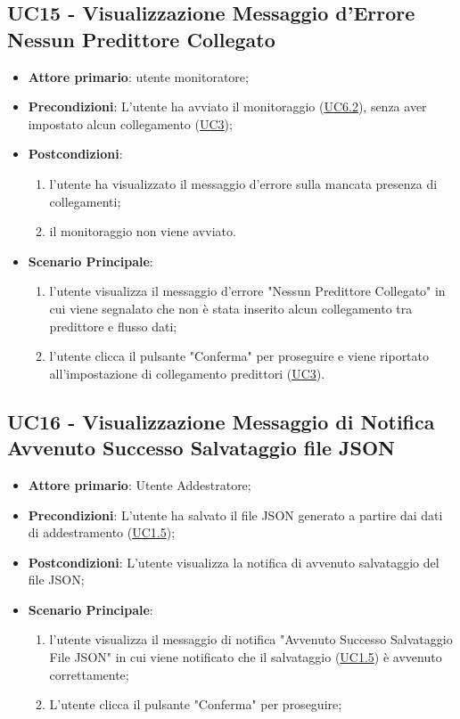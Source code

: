 	\subsection{UC15 - Visualizzazione Messaggio d'Errore Nessun Predittore Collegato}
		\begin{itemize}
			\item\textbf{Attore primario}: utente monitoratore;
			\item\textbf{Precondizioni}: L’utente ha avviato il monitoraggio (\hyperref[par:UC6.2]{UC6.2}), senza aver impostato alcun collegamento (\hyperref[par:UC3]{UC3});
			\item\textbf{Postcondizioni}: 
				\begin{enumerate}
					\item l’utente ha visualizzato il messaggio d'errore sulla mancata presenza di collegamenti;	
					\item	il monitoraggio non viene avviato.
				\end{enumerate}
			\item\textbf{Scenario Principale}: 
				\begin{enumerate} 
					\item l’utente visualizza il messaggio d'errore "Nessun Predittore Collegato" in cui viene segnalato che non è stata inserito alcun collegamento tra predittore e flusso dati; 
					\item l'utente clicca il pulsante "Conferma" per proseguire e viene riportato all'impostazione di collegamento predittori (\hyperref[par:UC3]{UC3}).		
				\end{enumerate}		
		\end{itemize}


	\label{par:UC16}
	\subsection{UC16 - Visualizzazione Messaggio di Notifica Avvenuto Successo Salvataggio file JSON}
		\begin{itemize}
			\item\textbf{Attore primario}: Utente Addestratore;
			\item\textbf{Precondizioni}: L'utente ha salvato il file JSON generato a partire dai dati di addestramento (\hyperref[par:UC1.5]{UC1.5}); 
			\item\textbf{Postcondizioni}: L'utente visualizza la notifica di avvenuto salvataggio del file JSON;					\item\textbf{Scenario Principale}: 
				\begin{enumerate} 
					\item l’utente visualizza il messaggio di notifica "Avvenuto Successo Salvataggio File JSON" in cui viene notificato che il salvataggio (\hyperref[par:UC1.5]{UC1.5}) è avvenuto correttamente;
					\item L'utente clicca il pulsante "Conferma" per proseguire;		
				\end{enumerate}		
		\end{itemize}
	
